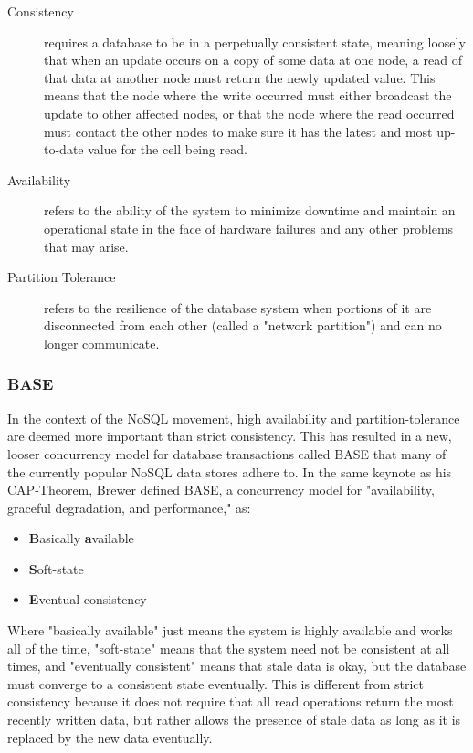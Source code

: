 \documentclass[11pt,a4paper]{report}
\begin{document}
\begin{description}
\item[Consistency] 
requires a database to be in a perpetually consistent state, meaning loosely that when an update occurs on a copy of some data at one node, a read of that data at another node must return the newly updated value. This means that the node where the write occurred must either broadcast the update to other affected nodes, or that the node where the read occurred must contact the other nodes to make sure it has the latest and most up-to-date value for the cell being read.
\item[Availability] refers to the ability of the system to minimize downtime and maintain an operational state in the face of hardware failures and any other problems that may arise.
\item[Partition Tolerance] refers to the resilience of the database system when portions of it are disconnected from each other (called a "network partition") and can no longer communicate.
\end{description}

\subsubsection{BASE}
In the context of the NoSQL movement, high availability and partition-tolerance are deemed more important than strict consistency. This has resulted in a new, looser concurrency model for database transactions called BASE that many of the currently popular NoSQL data stores adhere to. In the same keynote as his CAP-Theorem, Brewer defined BASE, a concurrency model for "availability, graceful degradation, and performance," as:
\begin{itemize}
\item \textbf{B}asically \textbf{a}vailable
\item \textbf{S}oft-state
\item \textbf{E}ventual consistency
\end{itemize}

Where "basically available" just means the system is highly available and works all of the time, "soft-state" means that the system need not be consistent at all times, and "eventually consistent" means that stale data is okay, but the database must converge to a consistent state eventually.\cite{brewer2000towards, strauch2011nosql} This is different from strict consistency because it does not require that all read operations return the most recently written data, but rather allows the presence of stale data as long as it is replaced by the new data eventually.
\end{document}
